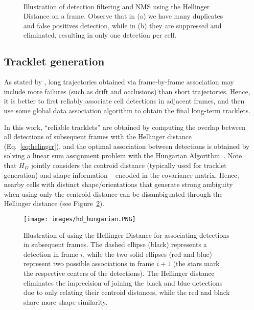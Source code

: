\documentclass{article}
\begin{document}
\begin{figure}[]
    \centering
    ~~
    \caption[Illustration of detection filtering and NMS using the Helinger Distance on a frame.]{Illustration of detection filtering and NMS using the Hellinger Distance on a frame. Observe that in (a) we have many duplicates and false positives detection, while in (b) they are suppressed and eliminated, resulting in only one detection per cell.}
    \label{fig:hd_nms}
\end{figure}

\subsection{Tracklet generation}

As stated by \cite{bise}, long trajectories obtained via frame-by-frame association may include more failures (such as drift and occlusions) than short trajectories. Hence, it is better to first reliably associate cell detections in adjacent frames,  and then use some global data association algorithm to obtain the final long-term tracklets. 

In this work, ``reliable tracklets'' are obtained by computing the overlap between all detections of subsequent frames with the Hellinger distance (Eq.~\eqref{eq:helinger}), and the optimal association between detections is obtained by solving a linear sum assignment problem with the Hungarian Algorithm~\cite{kuhn1955hungarian}. Note that $H_D$ jointly considers the centroid distance (typically used for tracklet generation) and shape information -- encoded in the covariance matrix. Hence, nearby cells with distinct shape/orientations that generate strong ambiguity when using only the centroid distance can be disambiguated through the Hellinger distance (see Figure~\ref{fig:hd_hungarian}).

\begin{figure}[]
    \centering
    \texttt{[image: images/hd\_hungarian.PNG]}
    \caption[Illustration of using the Helinger Distance for associating detections in subsequent frames.]{Illustration of using the Hellinger Distance for associating detections in subsequent frames. The dashed ellipse (black) represents a detection in frame $i$, while the two solid ellipses (red and blue) represent two possible associations in frame $i\!+\!1$ (the stars mark the respective centers of the detections).     The Hellinger distance eliminates the imprecision of joining the black and blue detections due to only relating their centroid distances, while the red and black share more shape similarity.}
    \label{fig:hd_hungarian}
\end{figure}
\end{document}
